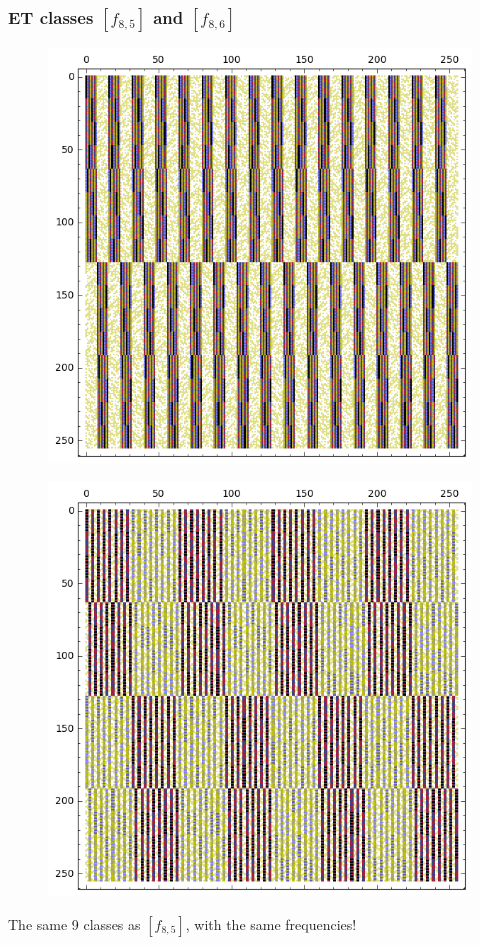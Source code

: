 \documentclass[pdf,sprung,slideColor,nocolorBG]{beamer}
\newenvironment{colortheme}[1]{
\def\ProvidesPackageRCS $##1${\relax}
\renewcommand{\ProcessOptions}{\relax}
\makeatletter

\makeatother
}{}
\begin{document}
\begin{colortheme}{jubata}

\begin{frame}
\frametitle{ET classes  $[f_{8,5}]$ and $[f_{8,6}]$}
\begin{figure}
\centering
\begin{minipage}{.48\textwidth}
  \centering
  \includegraphics[width=.9\linewidth]{../matrix_plot/re8_5_bent_cayley_graph_index_matrix.png}
  \label{fig:re8_5_bent_cayley_graph_index_matrix}
\end{minipage}%
\begin{minipage}{.48\textwidth}
  \centering
  \includegraphics[width=.9\linewidth]{../matrix_plot/re8_6_bent_cayley_graph_index_matrix.png}
  \label{fig:re8_6_bent_cayley_graph_index_matrix}
\end{minipage}
\end{figure}
The same 9 classes as $[f_{8,5}]$, with the same frequencies!
\end{frame}


\end{colortheme}
\end{document}
